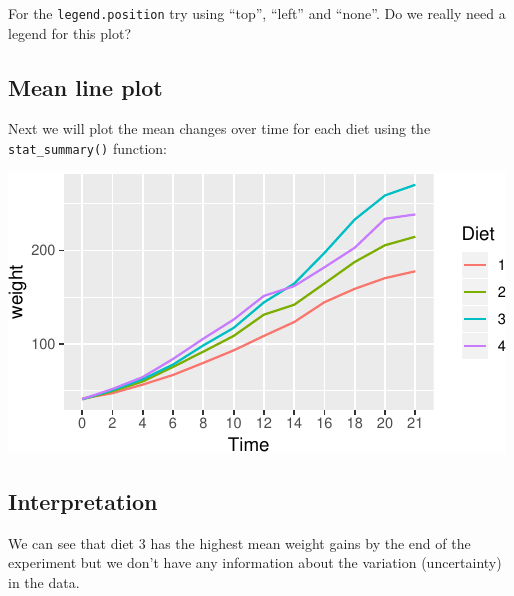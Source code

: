 \documentclass[letterpaperpaper,9pt,twocolumn,twoside,printwatermark=false]{pinp}
\begin{document}
For the \texttt{legend.position} try using ``top'', ``left'' and
``none''. Do we really need a legend for this plot?

\hypertarget{mean-line-plot}{%
\subsection{Mean line plot}\label{mean-line-plot}}

Next we will plot the mean changes over time for each diet using the
\texttt{stat\_summary()} function:

\begin{Shaded}
\begin{Highlighting}[]
               \OperatorTok{+}
\StringTok{  }\NormalTok{(}\NormalTok{, }\NormalTok{) }
\end{Highlighting}
\end{Shaded}

\begin{center}\includegraphics{Getting-Started-in-R_files/figure-latex/meanlinesPlot-1} \end{center}

\hypertarget{interpretation-3}{%
\subsection{Interpretation}\label{interpretation-3}}

We can see that diet 3 has the highest mean weight gains by the end of
the experiment but we don't have any information about the variation
(uncertainty) in the data.
\end{document}
